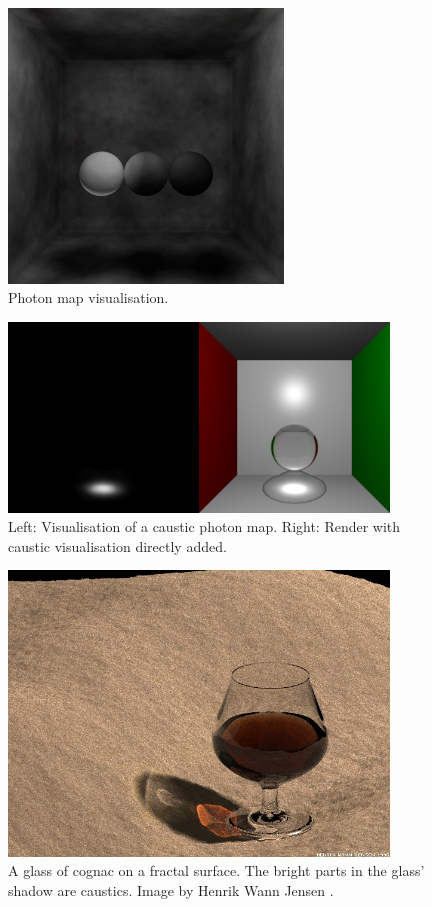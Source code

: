 \documentclass[a4paper]{article}
\begin{document}
\begin{figure}[h]
    \centering
    \includegraphics[width = 0.65\textwidth]{images/photonmap.png}
    \caption{Photon map visualisation.}\label{fig:pmap}
\end{figure}

\begin{figure}[h]
    \centering
    \includegraphics[width = 0.9\textwidth]{images/glassspherecaustics.png}
    \caption{Left: Visualisation of a caustic photon map. Right: Render with caustic visualisation directly added.}\label{fig:glasscaustics}
\end{figure}

\begin{figure}[h]
    \centering
    \includegraphics[width = 0.9\textwidth]{images/cognacglass.jpg}
    \caption{A glass of cognac on a fractal surface. The bright parts in the glass' shadow are caustics. Image by Henrik Wann Jensen \cite{Jensen1996photonmaps}.}\label{fig:cognac}
\end{figure}
\end{document}
